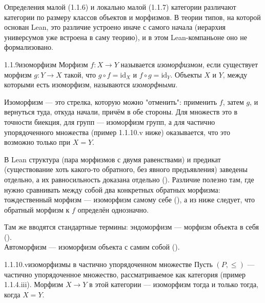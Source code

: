 \begin{remark}
Определения малой (1.1.6) и локально малой (1.1.7) категории различают категории по
размеру классов объектов и морфизмов. В теории типов, на которой основан Lean, это
различие устроено иначе с самого начала (иерархия универсумов уже встроена в саму
теорию), и в этом Lean-компаньоне оно не формализовано.
\end{remark}

\begin{definition}{1.1.9}{изоморфизм}
Морфизм $f \colon X \to Y$ называется \emph{изоморфизмом}, если существует морфизм $g
\colon Y \to X$ такой, что $g \circ f = \mathrm{id}_X$ и $f \circ g = \mathrm{id}_Y$.
Объекты $X$ и $Y$, между которыми есть изоморфизм, называются \emph{изоморфными}.
\end{definition}

\begin{intuition}
Изоморфизм — это стрелка, которую можно "отменить": применить $f$, затем $g$, и
вернуться туда, откуда начали, причём в обе стороны. Для множеств это в точности
биекция, для групп — изоморфизм групп, а для частично упорядоченного множества
(пример 1.1.10.v ниже) оказывается, что это возможно только при $X=Y$.
\end{intuition}

\begin{remark}
В Lean структура  (пара морфизмов с двумя равенствами) и предикат
 (существование хоть какого-то обратного, без явного предъявления) заведены
отдельно, а их равносильность доказана отдельно (). Различие
полезно там, где нужно сравнивать между собой два конкретных обратных морфизма:
тождественный морфизм — изоморфизм самому себе (), а из
 ниже следует, что обратный морфизм к $f$ определён
однозначно.
\end{remark}

\begin{remark}
Там же вводятся стандартные термины: эндоморфизм — морфизм объекта в себя
().\\
Автоморфизм — изоморфизм объекта с самим собой ().
\end{remark}

\begin{example}{1.1.10.v}{изоморфизмы в частично упорядоченном множестве}
Пусть $(P,\le)$ — частично упорядоченное множество, рассматриваемое как категория
(пример 1.1.4.iii). Морфизм $X \to Y$ в этой категории — изоморфизм тогда и только
тогда, когда $X = Y$.
\end{example}

